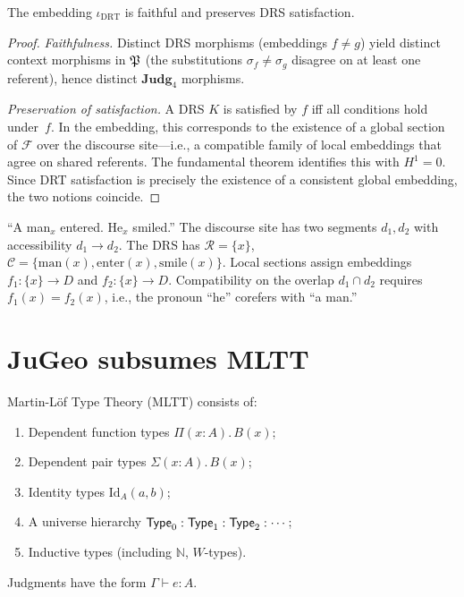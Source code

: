 \begin{theorem}
\label{thm:drt}
The embedding $\iota_{\mathrm{DRT}}$ is faithful and preserves
DRS satisfaction.
\end{theorem}

\begin{proof}
\emph{Faithfulness.}  Distinct DRS morphisms (embeddings $f \neq g$)
yield distinct context morphisms in $\mathfrak{P}$ (the substitutions
$\sigma_f \neq \sigma_g$ disagree on at least one referent),
hence distinct $\mathbf{Judg}_4$ morphisms.

\emph{Preservation of satisfaction.}  A DRS $K$ is satisfied by
$f$ iff all conditions hold under~$f$.  In the embedding, this
corresponds to the existence of a global section of $\mathcal{F}$
over the discourse site---i.e., a compatible family of local
embeddings that agree on shared referents.  The fundamental
theorem identifies this with $H^1 = 0$.  Since DRT
satisfaction is precisely the existence of a consistent global
embedding, the two notions coincide.
\end{proof}

\begin{example}
``A man$_x$ entered.  He$_x$ smiled.''  The discourse site has two
segments $d_1, d_2$ with accessibility $d_1 \to d_2$.  The DRS has
$\mathcal{R} = \{x\}$, $\mathcal{C} = \{\mathrm{man}(x),
\mathrm{enter}(x), \mathrm{smile}(x)\}$.  Local sections assign
embeddings $f_1 : \{x\} \to D$ and $f_2 : \{x\} \to D$.
Compatibility on the overlap $d_1 \cap d_2$ requires $f_1(x) =
f_2(x)$, i.e., the pronoun ``he'' corefers with ``a man.''
\end{example}

\section{JuGeo subsumes MLTT}
\label{sec:sub-mltt}

\begin{definition}[MLTT]
\label{def:mltt}
Martin-L\"of Type Theory (MLTT) consists of:
\begin{enumerate}[label=(\roman*),nosep]
\item Dependent function types $\Pi(x:A).\,B(x)$;
\item Dependent pair types $\Sigma(x:A).\,B(x)$;
\item Identity types $\mathrm{Id}_A(a,b)$;
\item A universe hierarchy $\mathsf{Type}_0 : \mathsf{Type}_1 : \mathsf{Type}_2 : \cdots$;
\item Inductive types (including $\mathbb{N}$, $W$-types).
\end{enumerate}
Judgments have the form $\Gamma \vdash e : A$.
\end{definition}

